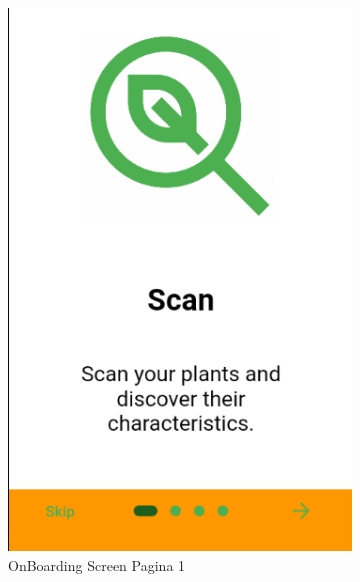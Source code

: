\documentclass[a4paper,12pt]{report}
\begin{document}
\begin{figure}[H]
	
\begin{subfigure}{0.3\textwidth} %
	\includegraphics[width=\textwidth]{./images/onboarding/onboarding_screen0.png}
	\caption{OnBoarding Screen Pagina 1}
	\label{fig:onboarding}
\end{subfigure}
\hfill
\begin{subfigure}{0.3\textwidth}

\end{subfigure}
\end{figure}
\end{document}
